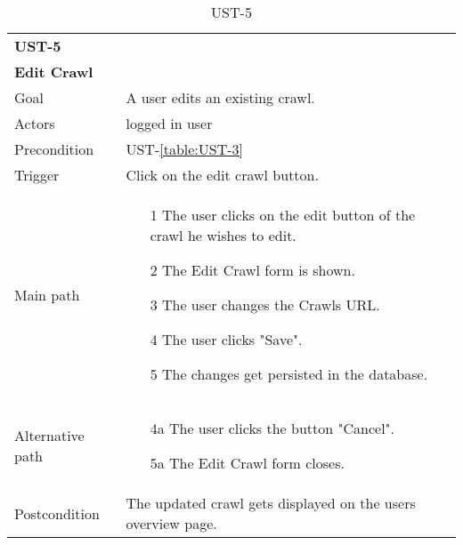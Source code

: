 \documentclass[titlepage, 12pt]{article}
\begin{document}
  \begin{table}[H]
    \begin{center}
  
      \begin{tabular}{p{4cm}|p{10cm}}
        \textbf{UST-5}\\ \textbf{Edit Crawl}                                            \\
        \hline
        Goal             & A user edits an existing crawl.                  \\
        \hline
        Actors           & logged in user                                               \\
        \hline
        Precondition     & UST-\ref{table:UST-3}                                     \\
        \hline
        Trigger          & Click on the edit crawl button.                            \\
        \hline
        Main path        &
        \begin{itemize}
          \item [1] The user clicks on the edit button of the crawl he wishes to edit.
          \item [2] The Edit Crawl form is shown.
          \item [3] The user changes the Crawls URL.
          \item [4] The user clicks "Save".
          \item [5] The changes get persisted in the database.
        \end{itemize}                                                         \\
        \hline
        Alternative path &
        \begin{itemize}
          \item [4a] The user clicks the button "Cancel".
          \item [5a] The Edit Crawl form closes.
        \end{itemize}                                                         \\
        \hline
        Postcondition    & The updated crawl gets displayed on the users overview page. \\
      \end{tabular}
  
      \caption{UST-5}
      \label{table:UST-5}
  
    \end{center}
  \end{table}
\end{document}
